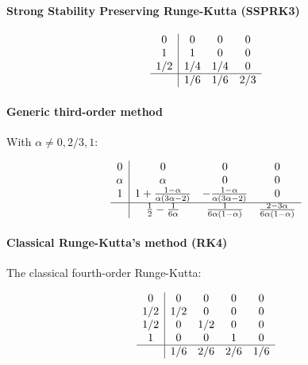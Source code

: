 \paragraph{Strong Stability Preserving Runge-Kutta (SSPRK3)}

\begin{equation}
	\begin{array}{c|ccc}
		0   & 0   & 0   & 0 \\
		1   & 1   & 0   & 0 \\
		1/2 & 1/4 & 1/4 & 0 \\ \hline
		    & 1/6 & 1/6 & 2/3
	\end{array}
	\label{eq::SSPRK3}
\end{equation}

\paragraph{Generic third-order method}
With $\alpha \neq 0, 2/3, 1$:

\begin{equation}
	\begin{array}{c|ccc}
		0      & 0      & 0 & 0 \\
		\alpha & \alpha & 0 & 0 \\
		1      & 1+\frac{1-\alpha}{\alpha(3\alpha-2)} & -\frac{1-\alpha}{\alpha(3\alpha-2)} & 0 \\ \hline
		       & \frac{1}{2}-\frac{1}{6\alpha} & \frac{1}{6\alpha(1-\alpha)} & \frac{2-3\alpha}{6\alpha(1-\alpha)}
	\end{array}
	\label{eq::generic_third}
\end{equation}

\paragraph{Classical Runge-Kutta's method (RK4)}
The classical fourth-order Runge-Kutta:

\begin{equation}
	\begin{array}
	{c|cccc}
		0   & 0   & 0   & 0   & 0 \\
		1/2 & 1/2 & 0   & 0   & 0 \\
		1/2 & 0   & 1/2 & 0   & 0 \\
		1   & 0   & 0   & 1   & 0 \\ \hline
		    & 1/6 & 2/6 & 2/6 & 1/6
	\end{array}
	\label{eq::RK4}
\end{equation}

